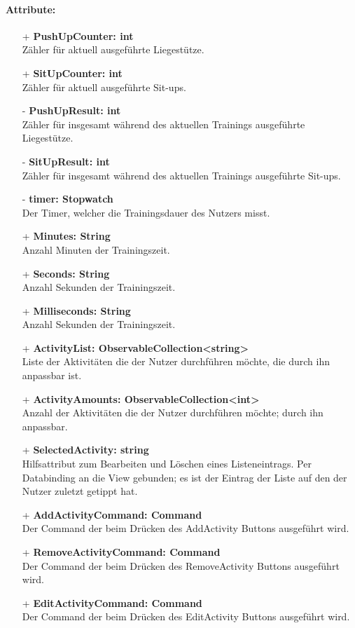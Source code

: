 \documentclass[a4paper,12pt]{article}
\begin{document}
\paragraph{Attribute:}
\begin{itemize}
	\item[+] \textbf{PushUpCounter: int} \\ Zähler für aktuell ausgeführte Liegestütze. 
	\item[+] \textbf{SitUpCounter: int} \\ Zähler für aktuell ausgeführte Sit-ups. 
	\item[-] \textbf{PushUpResult: int} \\ Zähler für insgesamt während des aktuellen Trainings ausgeführte Liegestütze. 
	\item[-] \textbf{SitUpResult: int} \\ Zähler für insgesamt während des aktuellen Trainings ausgeführte Sit-ups. 
	\item[-] \textbf{timer: Stopwatch} \\ Der Timer, welcher die Trainingsdauer des Nutzers misst. 
	\item[+] \textbf{Minutes: String} \\ Anzahl Minuten der Trainingszeit. 
	\item[+] \textbf{Seconds: String} \\  Anzahl Sekunden der Trainingszeit. 
	\item[+] \textbf{Milliseconds: String} \\ Anzahl Sekunden der Trainingszeit. 
	\item[+] \textbf{ActivityList: ObservableCollection<string>} \\ Liste der Aktivitäten die der Nutzer durchführen möchte, die durch ihn anpassbar ist. 
	\item[+] \textbf{ActivityAmounts: ObservableCollection<int>} \\ Anzahl der Aktivitäten die der Nutzer durchführen möchte; durch ihn anpassbar. 
	\item[+] \textbf{SelectedActivity: string} \\ Hilfsattribut zum Bearbeiten und Löschen eines Listeneintrags. Per Databinding an die View gebunden; es ist der Eintrag der Liste auf den der Nutzer zuletzt getippt hat. 
	\item[+] \textbf{AddActivityCommand: Command} \\ Der Command der beim Drücken des AddActivity Buttons ausgeführt wird. 
	\item[+] \textbf{RemoveActivityCommand: Command} \\ Der Command der beim Drücken des RemoveActivity Buttons ausgeführt wird. 
	\item[+] \textbf{EditActivityCommand: Command} \\ Der Command der beim Drücken des EditActivity Buttons ausgeführt wird. 
\end{itemize}
\end{document}
